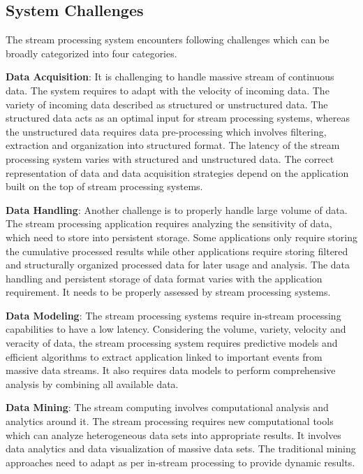 \documentclass{acm_proc_article-sp}
\begin{document}
\subsection{System Challenges}

The stream processing system encounters following challenges which can be broadly categorized into four categories.

\textbf{Data Acquisition}: It is challenging to handle massive stream of continuous data.  The system requires to adapt with the velocity of incoming data. The variety of incoming data described as structured or unstructured data. The structured data acts as an optimal input for stream processing systems, whereas the unstructured data requires data pre-processing which involves filtering, extraction and organization into structured format. The latency of the stream processing system varies with structured and unstructured data. The correct representation of data and data acquisition strategies depend on the application built on the top of stream processing systems.
  
\textbf{Data Handling}: Another challenge is to properly handle large volume of data. The stream processing application requires  analyzing the sensitivity of data, which need to store into persistent storage. Some applications only require storing the cumulative processed results while other applications require  storing filtered and structurally organized processed data for later usage and analysis. The data handling and persistent storage of data format varies with the application requirement. It needs to be properly assessed by stream processing systems.
  
\textbf{Data Modeling}: The stream processing systems require in-stream processing capabilities to have a low latency. Considering the volume, variety, velocity and veracity of data, the stream processing system requires predictive models and efficient algorithms to extract application linked to important events from massive data streams. It also requires data models to perform comprehensive analysis by combining all available data.
  
\textbf{Data Mining}: The stream computing involves computational analysis and analytics around it. The stream processing requires new computational tools which can analyze heterogeneous data sets into appropriate results. It involves data analytics and data visualization of massive data sets. The traditional mining approaches need to adapt as per in-stream processing to provide dynamic results. 
   
\end{document}
